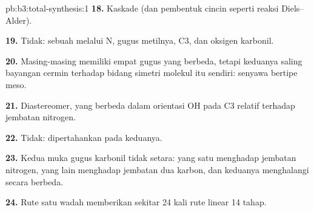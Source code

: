\begin{solution}{pb:b3:total-synthesis:1}
\textbf{18.} Kaskade (dan  pembentuk cincin seperti reaksi
Diels--Alder).

\textbf{19.} Tidak: sebuah  melalui N, gugus metilnya, C3, dan oksigen
karbonil.

\textbf{20.} Masing-masing memiliki empat gugus yang berbeda, tetapi keduanya saling bayangan cermin terhadap
bidang simetri molekul itu sendiri: senyawa bertipe meso.

\textbf{21.} Diastereomer, yang berbeda dalam orientasi OH pada C3 relatif terhadap
jembatan nitrogen.

\textbf{22.} Tidak:  dipertahankan pada keduanya.

\textbf{23.} Kedua muka gugus karbonil tidak setara: yang satu menghadap jembatan
nitrogen, yang lain menghadap jembatan dua karbon, dan keduanya menghalangi secara berbeda.

\textbf{24.} Rute satu wadah memberikan sekitar 24 kali  rute linear
14 tahap.
\end{solution}
